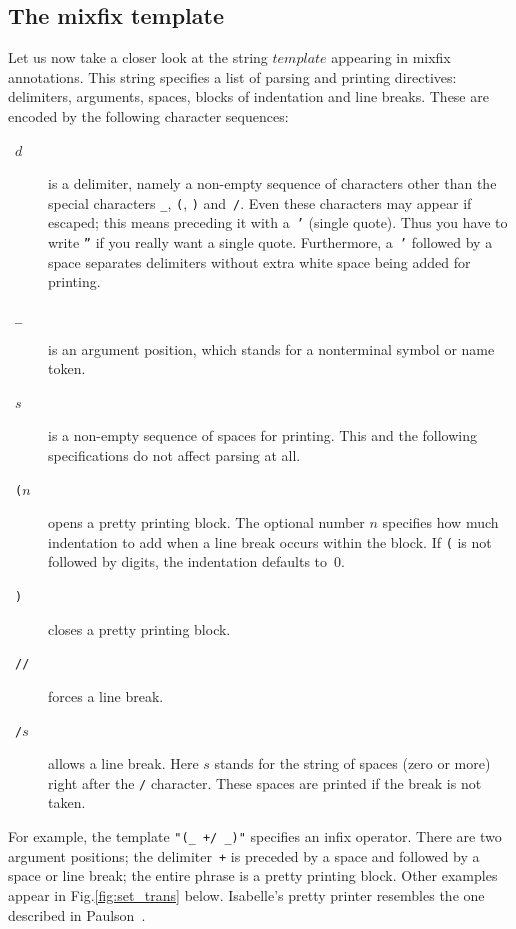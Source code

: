 \subsection{The mixfix template}
Let us now take a closer look at the string $template$ appearing in mixfix
annotations.  This string specifies a list of parsing and printing
directives: delimiters, arguments, spaces, blocks of
indentation and line breaks.  These are encoded by the following character
sequences:
\begin{description}
\item[~$d$~] is a delimiter, namely a non-empty sequence of characters
  other than the special characters {\tt _}, {\tt(}, {\tt)} and~{\tt/}.
  Even these characters may appear if escaped; this means preceding it with
  a~{\tt '} (single quote).  Thus you have to write {\tt ''} if you really
  want a single quote.  Furthermore, a~{\tt '} followed by a space separates
  delimiters without extra white space being added for printing.

\item[~{\tt_}~] is an argument position, which stands for a nonterminal symbol
  or name token.

\item[~$s$~] is a non-empty sequence of spaces for printing.  This and the
  following specifications do not affect parsing at all.

\item[~{\tt(}$n$~] opens a pretty printing block.  The optional number $n$
  specifies how much indentation to add when a line break occurs within the
  block.  If {\tt(} is not followed by digits, the indentation defaults
  to~0.

\item[~{\tt)}~] closes a pretty printing block.

\item[~{\tt//}~] forces a line break.

\item[~{\tt/}$s$~] allows a line break.  Here $s$ stands for the string of
  spaces (zero or more) right after the {\tt /} character.  These spaces
  are printed if the break is not taken.
\end{description}
For example, the template {\tt"(_ +/ _)"} specifies an infix operator.
There are two argument positions; the delimiter~{\tt+} is preceded by a
space and followed by a space or line break; the entire phrase is a pretty
printing block.  Other examples appear in Fig.\ts\ref{fig:set_trans} below.
Isabelle's pretty printer resembles the one described in
Paulson~\cite{paulson91}.

